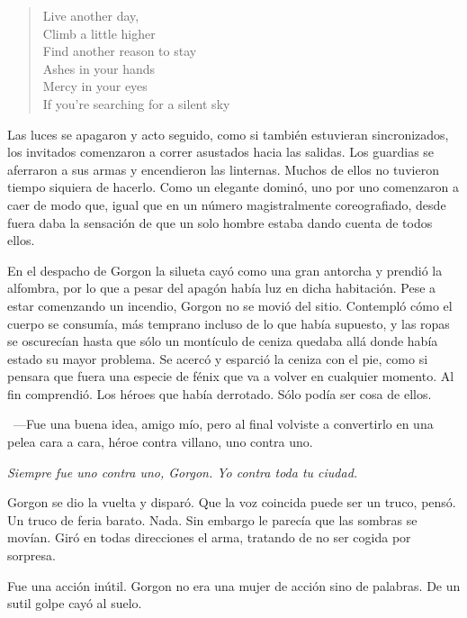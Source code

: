 \begin{verse}
    \begin{em}
        Live another day,\\
        Climb a little higher\\
        Find another reason to stay\\
        Ashes in your hands\\
        Mercy in your eyes\\
        If you're searching for a silent sky\\
    \end{em}
\end{verse}

Las luces se apagaron y acto seguido, como si también estuvieran sincronizados, los invitados comenzaron a correr asustados hacia las salidas. Los guardias se aferraron a sus armas y encendieron las linternas. Muchos de ellos no tuvieron tiempo siquiera de hacerlo. Como un elegante dominó, uno por uno comenzaron a caer de modo que, igual que en un número magistralmente coreografiado, desde fuera daba la sensación de que un solo hombre estaba dando cuenta de todos ellos.

\bigskip\noindent
En el despacho de Gorgon la silueta cayó como una gran antorcha y prendió la alfombra, por lo que a pesar del apagón había luz en dicha habitación. Pese a estar comenzando un incendio, Gorgon no se movió del sitio. Contempló cómo el cuerpo se consumía, más temprano incluso de lo que había supuesto, y las ropas se oscurecían hasta que sólo un montículo de ceniza quedaba allá donde había estado su mayor problema. Se acercó y esparció la ceniza con el pie, como si pensara que fuera una especie de fénix que va a volver en cualquier momento. Al fin comprendió. Los héroes que había derrotado. Sólo podía ser cosa de ellos.

~---Fue una buena idea, amigo mío, pero al final volviste a convertirlo en una pelea cara a cara, héroe contra villano, uno contra uno.

\emph{Siempre fue uno contra uno, Gorgon. Yo contra toda tu ciudad.}

Gorgon se dio la vuelta y disparó. Que la voz coincida puede ser un truco, pensó. Un truco de feria barato. Nada. Sin embargo le parecía que las sombras se movían. Giró en todas direcciones el arma, tratando de no ser cogida por sorpresa.

Fue una acción inútil. Gorgon no era una mujer de acción sino de palabras. De un sutil golpe cayó al suelo.

